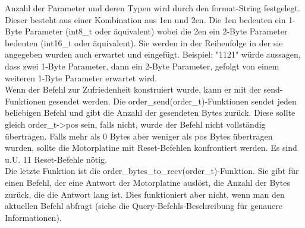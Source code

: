 \documentclass[a4paper]{article}
\begin{document}
	Anzahl der Parameter und deren Typen wird durch den format-String festgelegt. Dieser besteht aus einer Kombination
	aus 1en und 2en. Die 1en bedeuten ein 1-Byte Parameter (int8\_t oder äquivalent) wobei die 2en ein 2-Byte
	Parameter bedeuten (int16\_t oder äquivalent). Sie werden in der Reihenfolge in der sie angegeben wurden auch erwartet
	und eingefügt. Beispiel: "1121" würde aussagen, dass zwei 1-Byte Parameter, dann ein 2-Byte Parameter, gefolgt von
	einem weiteren 1-Byte Parameter erwartet wird.\\
	Wenn der Befehl zur Zufriedenheit konstruiert wurde, kann er mit der send-Funktionen gesendet werden.
	Die order\_send(order\_t)-Funktionen sendet jeden beliebigen Befehl und gibt die Anzahl der gesendeten
	Bytes zurück. Diese sollte gleich order\_t->pos sein, falls nicht, wurde der Befehl nicht vollständig
	übertragen. Falls mehr als 0 Bytes aber weniger als pos Bytes übertragen wurden, sollte die Motorplatine
	mit Reset-Befehlen konfrontiert werden. Es sind u.U. 11 Reset-Befehle nötig.\\
	Die letzte Funktion ist die order\_bytes\_to\_recv(order\_t)-Funktion. Sie gibt für einen Befehl, der eine
	Antwort der Motorplatine auslöst, die Anzahl der Bytes zurück, die die Antwort lang ist. Dies funktioniert
	aber nicht, wenn man den aktuellen Befehl abfragt (siehe die Query-Befehls-Beschreibung für genauere
	Informationen).
\end{document}
